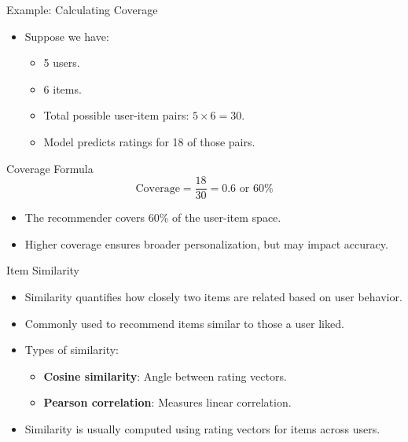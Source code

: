 \documentclass{beamer}
\begin{document}
\begin{frame}{Example: Calculating Coverage}
\begin{itemize}
    \item Suppose we have:
    \begin{itemize}
        \item 5 users.
        \item 6 items.
        \item Total possible user-item pairs: \( 5 \times 6 = 30 \).
        \item Model predicts ratings for 18 of those pairs.
    \end{itemize}
\end{itemize}

\begin{block}{Coverage Formula}
\[
\text{Coverage} = \frac{18}{30} = 0.6 \text{ or } 60\%
\]
\end{block}

\begin{itemize}
    \item The recommender covers 60\% of the user-item space.
    \item Higher coverage ensures broader personalization, but may impact accuracy.
\end{itemize}
\end{frame}

\begin{frame}{Item Similarity}
\begin{itemize}
    \item Similarity quantifies how closely two items are related based on user behavior.
    \item Commonly used to recommend items similar to those a user liked.
    \item Types of similarity:
    \begin{itemize}
        \item \textbf{Cosine similarity}: Angle between rating vectors.
        \item \textbf{Pearson correlation}: Measures linear correlation.
    \end{itemize}
    \item Similarity is usually computed using rating vectors for items across users.
\end{itemize}
\end{frame}
\end{document}

